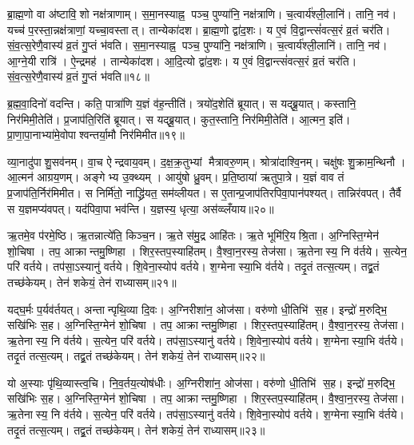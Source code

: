 ब्रा॒ह्म॒णो वा अ॑ष्टावि॒शो नक्ष॑त्राणाम्। स॒मा॒नस्याह्न॒ पञ्च॒ पुण्या॑नि॒ नक्ष॑त्राणि। च॒त्वार्य॑श्ली॒लानि॑। तानि॒ नव॑। यच्च॑ प॒रस्ता॒न्नक्ष॑त्राणां॒ यच्चा॒वस्तात्। तान्येका॑दश। ब्रा॒ह्म॒णो द्वा॑द॒शः। य ए॒वं वि॒द्वान्त्सं॑वत्स॒रं व्र॒तं चर॑ति। सं॒व॒त्स॒रेणै॒वास्य॑ व्र॒तं गु॒प्तं भ॑वति। स॒मा॒नस्याह्न॒ पञ्च॒ पुण्या॑नि॒ नक्ष॑त्राणि। च॒त्वार्य॑श्ली॒लानि॑। तानि॒ नव॑। आ॒ग्ने॒यी रात्रि॑। ऐ॒न्द्रमह॑। तान्येका॑दश। आ॒दि॒त्यो द्वा॑द॒शः। य ए॒वं वि॒द्वान्त्सं॑वत्स॒रं व्र॒तं चर॑ति। सं॒व॒त्स॒रेणै॒वास्य॑ व्र॒तं गु॒प्तं भ॑वति॥१८॥\anuvakamend[स॒ङ्ग॒वाथ्षो॑ड॒शिन॒न्निर॑मिमत॒ तत्तदात्त॑वीर्यन्निर्मा॒र्गो व॑देद्भवति समा॒नस्याह्न॒ पञ्च॒ पुण्या॑नि॒ नक्ष॑त्राण्य॒ष्टौ च॑]

ब्र॒ह्म॒वा॒दिनो॑ वदन्ति। कति॒ पात्रा॑णि य॒ज्ञं व॑ह॒न्तीति॑। त्रयो॑द॒शेति॑ ब्रूयात्। स यद्ब्रू॒यात्। कस्तानि॒ निर॑मिमी॒तेति॑। प्र॒जाप॑ति॒रिति॑ ब्रूयात्। स यद्ब्रू॒यात्। कुत॒स्तानि॒ निर॑मिमी॒तेति॑। आ॒त्मन॒ इति॑। प्रा॒णा॒पा॒नाभ्या॑मे॒वोपा\-श्वन्तर्या॒मौ निर॑मिमीत॥१९॥

व्या॒नादु॑पाशु॒सव॑नम्। वा॒च ऐन्द्रवाय॒वम्। द॒क्ष॒क्र॒तुभ्यां मैत्रावरु॒णम्। श्रोत्रा॑दाश्वि॒नम्। चक्षु॑षः शु॒क्राम॒न्थिनौ। आ॒त्मन॑ आग्रय॒णम्। अङ्गेभ्य उ॒क्थ्यम्। आयु॑षो ध्रु॒वम्। प्र॒ति॒ष्ठाया॑ ऋतुपा॒त्रे। य॒ज्ञं वाव तं प्र॒जाप॑ति॒र्निर॑मिमीत। स निर्मि॑तो॒ नाद्ध्रि॑यत॒ सम॑व्लीयत। स ए॒तान्प्र॒जाप॑तिरपिवा॒पान॑पश्यत्। तान्निर॑वपत्। तैर्वै स य॒ज्ञमप्य॑वपत्। यद॑पिवा॒पा भव॑न्ति। य॒ज्ञस्य॒ धृत्या॒ अस॑व्व्लँयाय॥२०॥\anuvakamend[उ॒पा॒श्व॒न्त॒र्या॒मौ निर॑मिमीतामिमीत॒ षट्च॑]

ऋ॒तमे॒व प॑रमे॒ष्ठि। ऋ॒तन्नात्ये॑ति॒ किञ्च॒न। ऋ॒ते स॑मु॒द्र आहि॑तः। ऋ॒ते भूमि॑रि॒यश्रि॒ता। अ॒ग्निस्ति॒ग्मेन॑ शो॒चिषा। तप॒ आक्रान्तमु॒ष्णिहा। शिर॒स्तप॒स्याहि॑तम्। वै॒श्वा॒न॒रस्य॒ तेज॑सा। ऋ॒तेनास्य॒ नि व॑र्तये। स॒त्येन॒ परि॑ वर्तये। तप॑सा॒ऽस्यानु॑ वर्तये। शि॒वेना॒स्योप॑ वर्तये। श॒ग्मेनास्या॒भि व॑र्तये। तदृ॒तं तत्स॒त्यम्। तद्व्र॒तं तच्छ॑केयम्। तेन॑ शकेयं॒ तेन॑ राध्यासम्॥२१॥

यद्घ॒र्मः प॒र्यव॑र्तयत्। अन्तान्पृथि॒व्या दि॒वः। अ॒ग्निरीशा॑न॒ ओज॑सा। वरु॑णो धी॒तिभि॑ स॒ह। इन्द्रो॑ म॒रुद्भि॒ सखि॑भिः स॒ह। अ॒ग्निस्ति॒ग्मेन॑ शो॒चिषा। तप॒ आक्रान्तमु॒ष्णिहा। शिर॒स्तप॒स्याहि॑तम्। वै॒श्वा॒न॒रस्य॒ तेज॑सा। ऋ॒तेनास्य॒ नि व॑र्तये। स॒त्येन॒ परि॑ वर्तये। तप॑सा॒ऽस्यानु॑ वर्तये। शि॒वेना॒स्योप॑ वर्तये। श॒ग्मेनास्या॒भि व॑र्तये। तदृ॒तं तत्स॒त्यम्। तद्व्र॒तं तच्छ॑केयम्। तेन॑ शकेयं॒ तेन॑ राध्यासम्॥२२॥

यो अ॒स्याः पृ॑थि॒व्यास्त्व॒चि। नि॒व॒र्तय॒त्योष॑धीः। अ॒ग्निरीशा॑न॒ ओज॑सा। वरु॑णो धी॒तिभि॑ स॒ह। इन्द्रो॑ म॒रुद्भि॒ सखि॑भिः स॒ह। अ॒ग्निस्ति॒ग्मेन॑ शो॒चिषा। तप॒ आक्रान्तमु॒ष्णिहा। शिर॒स्तप॒स्याहि॑तम्। वै॒श्वा॒न॒रस्य॒ तेज॑सा। ऋ॒तेनास्य॒ नि व॑र्तये। स॒त्येन॒ परि॑ वर्तये। तप॑सा॒ऽस्यानु॑ वर्तये। शि॒वेना॒स्योप॑ वर्तये। श॒ग्मेनास्या॒भि व॑र्तये। तदृ॒तं तत्स॒त्यम्। तद्व्र॒तं तच्छ॑केयम्। तेन॑ शकेयं॒ तेन॑ राध्यासम्॥२३॥

